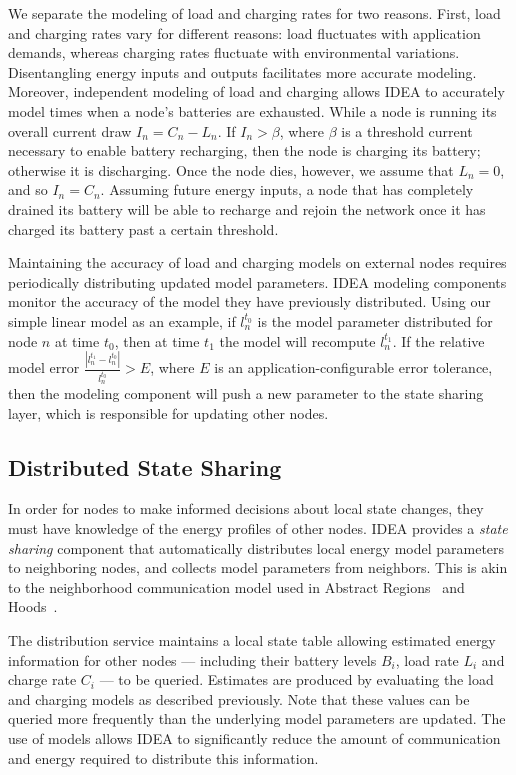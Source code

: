 We separate the modeling of load and charging rates for two reasons. First,
load and charging rates vary for different reasons: load fluctuates with
application demands, whereas charging rates fluctuate with environmental
variations. Disentangling energy inputs and outputs facilitates more accurate
modeling. Moreover, independent modeling of load and charging allows IDEA to
accurately model times when a node's batteries are exhausted. While a node is
running its overall current draw $I_n = C_n - L_n$. If $I_n > \beta$, where
$\beta$ is a threshold current necessary to enable battery recharging, then
the node is charging its battery; otherwise it is discharging. Once the node
dies, however, we assume that $L_n = 0$, and so $I_n = C_n$. Assuming future
energy inputs, a node that has completely drained its battery will be able to
recharge and rejoin the network once it has charged its battery past a
certain threshold.

Maintaining the accuracy of load and charging models on external nodes
requires periodically distributing updated model parameters.  IDEA modeling
components monitor the accuracy of the model they have previously
distributed. Using our simple linear model as an example, if $l_n^{t_0}$ is
the model parameter distributed for node $n$ at time $t_0$, then at time
$t_1$ the model will recompute $l_n^{t_1}$. If the relative model error
$\frac{\left| l_n^{t_1} - l_n^{t_0} \right|}{l_n^{t_0}} > E$, where $E$ is an
application-configurable error tolerance, then the modeling component will
push a new parameter to the state sharing layer, which is responsible for
updating other nodes.

\subsection{Distributed State Sharing}

In order for nodes to make informed decisions about local state changes, they
must have knowledge of the energy profiles of other nodes. IDEA provides a
\textit{state sharing} component that automatically distributes local energy
model parameters to neighboring nodes, and collects model parameters from
neighbors. This is akin to the neighborhood communication model used in
Abstract Regions~\cite{regions-nsdi04} and Hoods~\cite{hoods-mobisys}.

The distribution service maintains a local state table allowing estimated
energy information for other nodes --- including their battery levels $B_i$,
load rate $L_i$ and charge rate $C_i$ --- to be queried.  Estimates are
produced by evaluating the load and charging models as described previously.
Note that these values can be queried more frequently than the underlying
model parameters are updated. The use of models allows IDEA to significantly
reduce the amount of communication and energy required to distribute this
information.

